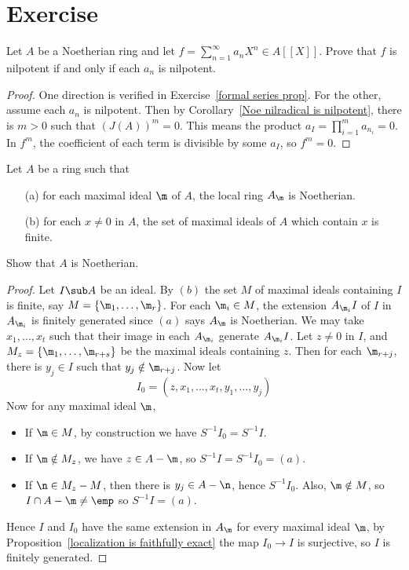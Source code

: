 \section{Exercise}
\begin{exercise}
Let $A$ be a Noetherian ring and let $f=\sum_{n=1}^{\infty}a_nX^n\in A[[X]]$. Prove that $f$ is nilpotent if and only if each $a_n$ is nilpotent.
\end{exercise}
\begin{proof}
One direction is verified in Exercise~\ref{formal series prop}. For the other, assume each $a_n$ is nilpotent. Then by Corollary~\ref{Noe nilradical is nilpotent}, there is $m>0$ such that $(J(A))^m=0$. This means the product $a_I=\prod_{i=1}^ma_{n_i}=0$. In $f^m$, the coefficient of each term is divisible by some $a_I$, so $f^m=0$.
\end{proof}
\begin{exercise}
Let $A$ be a ring such that
\begin{itemize}
\item[(a)] for each maximal ideal $\m$ of $A$, the local ring $A_\m$ is Noetherian.
\item[(b)] for each $x\neq 0$ in $A$, the set of maximal ideals of $A$ which contain $x$ is finite.
\end{itemize}
Show that $A$ is Noetherian.
\end{exercise}
\begin{proof}
Let $I\sub A$ be an ideal. By $(b)$ the set $M$ of maximal ideals containing $I$ is finite, say $M=\{\m_1,\dots,\m_r\}$. For each $\m_i\in M$, the extension $A_{\m_i}I$ of $I$ in $A_{\m_i}$ is finitely generated since $(a)$ says $A_\m$ is Noetherian. We may take $x_1,\dots,x_t$ such that their image in each $A_{\m_i}$ generate $A_{\m_i}I$. Let $z\neq 0$ in $I$, and $M_z=\{\m_1,\dots,\m_{r+s}\}$ be the maximal ideals containing $z$. Then for each $\m_{r+j}$, there is $y_j\in I$ such that $y_j\notin\m_{r+j}$. Now let
\[I_0=(z,x_1,\dots,x_t,y_1,\dots,y_j)\]
Now for any maximal ideal $\m$, 
\begin{itemize}
\item If $\m\in M$, by construction we have $S^{-1}I_0=S^{-1}I$.
\item If $\m\notin M_z$, we have $z\in A-\m$, so $S^{-1}I=S^{-1}I_0=(a)$.
\item If $\n\in M_z-M$, then there is $y_j\in A-\n$, hence $S^{-1}I_0$. Also, $\m\notin M$, so $I\cap A-\m\neq\emp$ so $S^{-1}I=(a)$.
\end{itemize}  
Hence $I$ and $I_0$ have the same extension in $A_\m$ for every maximal ideal $\m$, by Proposition~\ref{localization is faithfully exact} the map $I_0\to I$ is surjective, so $I$ is finitely generated.
\end{proof}
